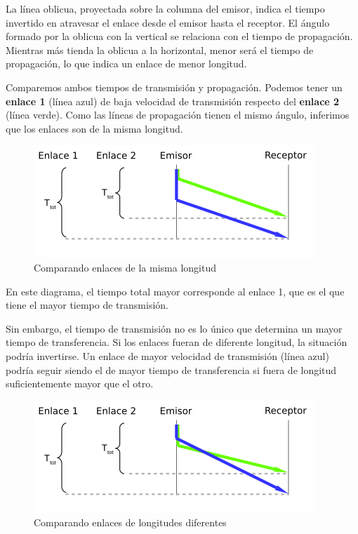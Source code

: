 \documentclass[spanish,A4,]{article}
\begin{document}
La línea oblicua, proyectada sobre la columna del emisor, indica el
tiempo invertido en atravesar el enlace desde el emisor hasta el
receptor. El ángulo formado por la oblicua con la vertical se relaciona
con el tiempo de propagación. Mientras más tienda la oblicua a la
horizontal, menor será el tiempo de propagación, lo que indica un enlace
de menor longitud.

Comparemos ambos tiempos de transmisión y propagación. Podemos tener un
\textbf{enlace 1} (línea azul) de baja velocidad de transmisión respecto
del \textbf{enlace 2} (línea verde). Como las líneas de propagación
tienen el mismo ángulo, inferimos que los enlaces son de la misma
longitud.

\begin{figure}[htbp]
\centering
\includegraphics{img/enlaces-1.png}
\caption{Comparando enlaces de la misma longitud}
\end{figure}

En este diagrama, el tiempo total mayor corresponde al enlace 1, que es
el que tiene el mayor tiempo de transmisión.

Sin embargo, el tiempo de transmisión no es lo único que determina un
mayor tiempo de transferencia. Si los enlaces fueran de diferente
longitud, la situación podría invertirse. Un enlace de mayor velocidad
de transmisión (línea azul) podría seguir siendo el de mayor tiempo de
transferencia si fuera de longitud suficientemente mayor que el otro.

\begin{figure}[htbp]
\centering
\includegraphics{img/enlaces-2.png}
\caption{Comparando enlaces de longitudes diferentes}
\end{figure}
\end{document}
